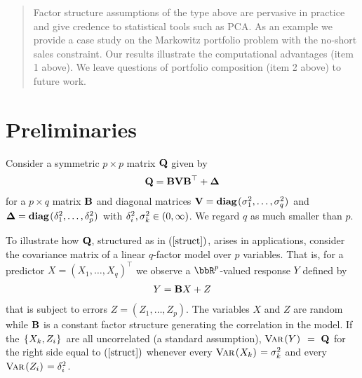 \documentclass[12pt,leqno,letterpaper]{article}
\begin{document}
\begin{abstract}
\hspace*{0.32in} Factor structure assumptions of the type 
above are pervasive in practice and give credence to 
statistical tools such as PCA. As an example we provide a
case study on the Markowitz portfolio problem with the no-short
sales constraint. Our results illustrate the 
computational advantages (item 1 above).
We leave questions of portfolio composition 
(item 2 above) to future work.

\end{abstract}


\section{Preliminaries} Consider a symmetric $p \times p$
matrix $\mathbf{Q}$ given by 
\begin{align} \label{struct}
  \mathbf{Q} = \mathbf{B} \mathbf{V} \mathbf{B}^\top + {\bm{\Delta}}
\end{align}
for a $p \times q$ matrix $\mathbf{B}$ and diagonal matrices $\mathbf{V} =
\textbf{diag}\hspace{1pt} ( \hspace{0.25pt} {\sigma_1^2, \dots, \sigma_q^2} \hspace{0.25pt} ) \hspace{1pt}$ and ${\bm{\Delta}} =
\textbf{diag}\hspace{1pt} ( \hspace{0.25pt} {\ensuremath{\delta^2}_1, \dots, \ensuremath{\delta^2}_p} \hspace{0.25pt} ) \hspace{1pt}$ with $\delta^2_i, \sigma_k^2
\in (0,\infty)$.  We regard $q$ as much smaller than $p$. 

To illustrate how $\mathbf{Q}$, structured as in $\req{struct}$, arises
in applications, consider the covariance matrix of a linear
$q$-factor model over $p$ variables. That is, for a predictor $X =
(X_1, \dots, X_q)^\top$ we observe a $\bbR^p$-valued response
$Y$ defined by 
\begin{align}
  Y = \mathbf{B} X + Z
\end{align} 
that is subject to errors $Z = (Z_1, \dots, Z_p)$. The
variables $X$ and $Z$ are random while $\mathbf{B}$ is a constant
factor structure generating the correlation in the model.  If
the $\hspace{1pt} \{ \hspace{0.25pt} {X_k,Z_i} \hspace{0.25pt} \} \hspace{1pt}$ are all uncorrelated (a standard assumption),
$\textsc{Var}\hspace{1pt} ( \hspace{0.25pt} {Y} \hspace{0.25pt} ) \hspace{1pt}~=~\mathbf{Q}$ for the right side equal to $\req{struct}$ 
whenever
every $\textsc{Var}\hspace{1pt} ( \hspace{0.25pt} {X_k} \hspace{0.25pt} ) \hspace{1pt} = \sigma_k^2$ and every $\textsc{Var}\hspace{1pt} ( \hspace{0.25pt} {Z_i} \hspace{0.25pt} ) \hspace{1pt} =
\delta_i^2$.  
\end{document}
